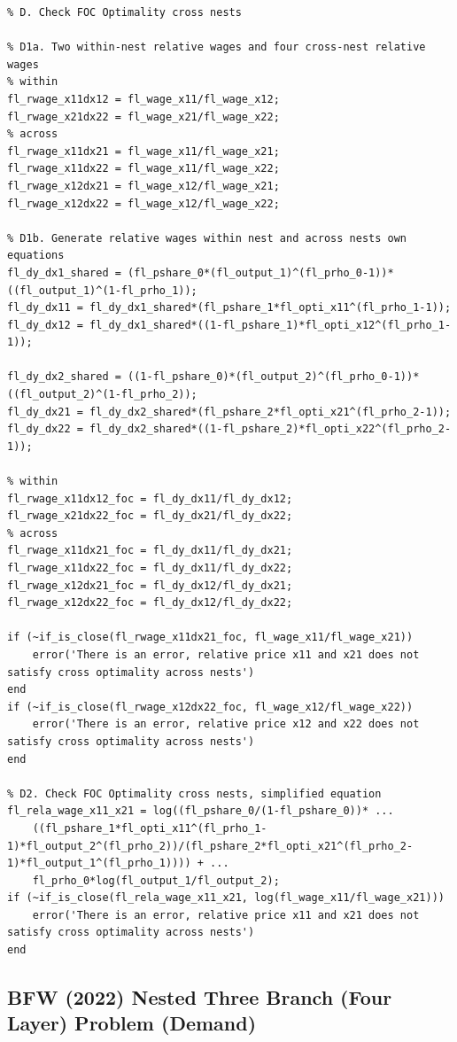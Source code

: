 \documentclass[
]{book}
\begin{document}
\begin{verbatim}
% D. Check FOC Optimality cross nests

% D1a. Two within-nest relative wages and four cross-nest relative wages
% within
fl_rwage_x11dx12 = fl_wage_x11/fl_wage_x12;
fl_rwage_x21dx22 = fl_wage_x21/fl_wage_x22;
% across
fl_rwage_x11dx21 = fl_wage_x11/fl_wage_x21;
fl_rwage_x11dx22 = fl_wage_x11/fl_wage_x22;
fl_rwage_x12dx21 = fl_wage_x12/fl_wage_x21;
fl_rwage_x12dx22 = fl_wage_x12/fl_wage_x22;

% D1b. Generate relative wages within nest and across nests own equations
fl_dy_dx1_shared = (fl_pshare_0*(fl_output_1)^(fl_prho_0-1))*((fl_output_1)^(1-fl_prho_1));
fl_dy_dx11 = fl_dy_dx1_shared*(fl_pshare_1*fl_opti_x11^(fl_prho_1-1));
fl_dy_dx12 = fl_dy_dx1_shared*((1-fl_pshare_1)*fl_opti_x12^(fl_prho_1-1));

fl_dy_dx2_shared = ((1-fl_pshare_0)*(fl_output_2)^(fl_prho_0-1))*((fl_output_2)^(1-fl_prho_2));
fl_dy_dx21 = fl_dy_dx2_shared*(fl_pshare_2*fl_opti_x21^(fl_prho_2-1));
fl_dy_dx22 = fl_dy_dx2_shared*((1-fl_pshare_2)*fl_opti_x22^(fl_prho_2-1));

% within
fl_rwage_x11dx12_foc = fl_dy_dx11/fl_dy_dx12;
fl_rwage_x21dx22_foc = fl_dy_dx21/fl_dy_dx22;
% across
fl_rwage_x11dx21_foc = fl_dy_dx11/fl_dy_dx21;
fl_rwage_x11dx22_foc = fl_dy_dx11/fl_dy_dx22;
fl_rwage_x12dx21_foc = fl_dy_dx12/fl_dy_dx21;
fl_rwage_x12dx22_foc = fl_dy_dx12/fl_dy_dx22;

if (~if_is_close(fl_rwage_x11dx21_foc, fl_wage_x11/fl_wage_x21))
    error('There is an error, relative price x11 and x21 does not satisfy cross optimality across nests')
end
if (~if_is_close(fl_rwage_x12dx22_foc, fl_wage_x12/fl_wage_x22))
    error('There is an error, relative price x12 and x22 does not satisfy cross optimality across nests')
end

% D2. Check FOC Optimality cross nests, simplified equation
fl_rela_wage_x11_x21 = log((fl_pshare_0/(1-fl_pshare_0))* ...
    ((fl_pshare_1*fl_opti_x11^(fl_prho_1-1)*fl_output_2^(fl_prho_2))/(fl_pshare_2*fl_opti_x21^(fl_prho_2-1)*fl_output_1^(fl_prho_1)))) + ...
    fl_prho_0*log(fl_output_1/fl_output_2);
if (~if_is_close(fl_rela_wage_x11_x21, log(fl_wage_x11/fl_wage_x21)))
    error('There is an error, relative price x11 and x21 does not satisfy cross optimality across nests')
end
\end{verbatim}

\hypertarget{bfw-2022-nested-three-branch-four-layer-problem-demand}{%
\subsection{BFW (2022) Nested Three Branch (Four Layer) Problem (Demand)}\label{bfw-2022-nested-three-branch-four-layer-problem-demand}}
\end{document}
